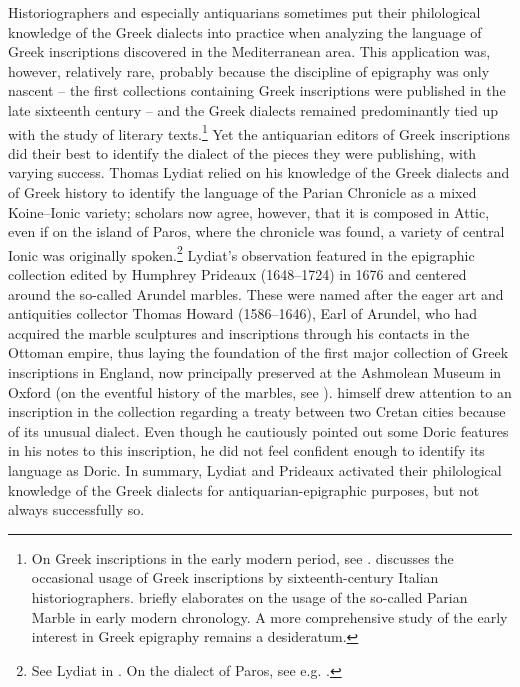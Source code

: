 Historiographers and especially antiquarians sometimes put their philological knowledge of the Greek dialects into practice when analyzing the language of Greek inscriptions discovered in the Mediterranean area. This application was, however, relatively rare, probably because the discipline of epigraphy was only nascent – the first collections containing Greek inscriptions were published in the late sixteenth century – and the Greek dialects remained predominantly tied up with the study of literary texts.\footnote{On Greek inscriptions in the early modern period, see \citet{Stenhouse_greekness_nodate}. \citet{Stenhouse2005} discusses the occasional usage of Greek inscriptions by sixteenth-century Italian historiographers. \citet{Liddel2014} briefly elaborates on the usage of the so-called Parian Marble in early modern chronology. A more comprehensive study of the early interest in Greek epigraphy remains a desideratum.} Yet the antiquarian editors of Greek inscriptions did their best to identify the dialect of the pieces they were publishing, with varying success. Thomas Lydiat relied on his knowledge of the Greek dialects and of Greek history to identify the language of the Parian Chronicle as a mixed Koine–Ionic variety; scholars now agree, however, that it is composed in Attic, even if on the island of Paros, where the chronicle was found, a variety of central Ionic was originally spoken.\footnote{See Lydiat in \citet[\textsc{ii}.116–117]{Prideaux1676}. On the dialect of Paros, see e.g. \citet[531]{Alonso2018}.} Lydiat’s observation featured in the epigraphic collection edited by Humphrey Prideaux (1648–1724) in 1676 and centered around the so-called Arundel marbles. These were named after the eager art and antiquities collector Thomas Howard (1586–1646), Earl of Arundel, who had acquired the marble sculptures and inscriptions through his contacts in the Ottoman empire, thus laying the foundation of the first major collection of Greek inscriptions in England, now principally preserved at the Ashmolean Museum in Oxford (on the eventful history of the marbles, see \citealt{Vickers2006}). \citet[\textsc{i.}a.1\textsc{\textsuperscript{v}}, 123]{Prideaux1676} himself drew attention to an inscription in the collection regarding a treaty between two Cretan cities because of its unusual dialect. Even though he cautiously pointed out some Doric features in his notes to this inscription, he did not feel confident enough to identify its language as Doric. In summary, Lydiat and Prideaux activated their philological knowledge of the Greek dialects for antiquarian-epigraphic purposes, but not always successfully so.

